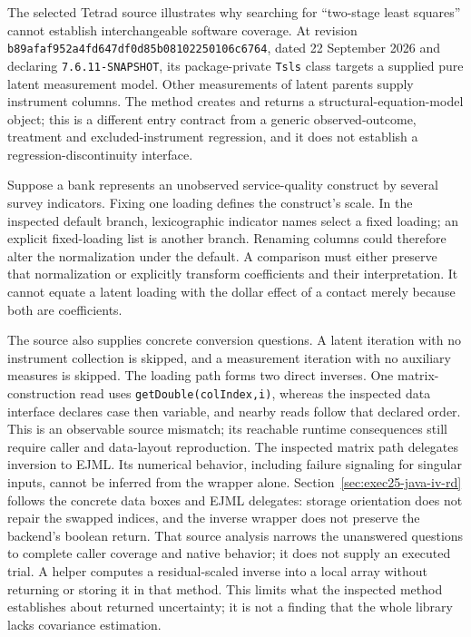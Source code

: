 The selected Tetrad source illustrates why searching for ``two-stage least
squares'' cannot establish interchangeable software coverage. At revision
\texttt{b89afaf952a4fd647df0}\allowbreak\texttt{d85b08102250106c6764}, dated 22 September 2026
and declaring \texttt{7.6.11-SNAPSHOT}, its package-private \texttt{Tsls}
class targets a supplied pure latent measurement model. Other measurements of
latent parents supply instrument columns. The method creates and returns a
structural-equation-model object; this is a different entry contract from a
generic observed-outcome, treatment and excluded-instrument regression, and
it does not establish a regression-discontinuity interface.
\citep{exec22_java_latent_iv_preflight}

Suppose a bank represents an unobserved service-quality construct by several
survey indicators. Fixing one loading defines the construct's scale. In the
inspected default branch, lexicographic indicator names select a fixed loading;
an explicit fixed-loading list is another branch. Renaming columns could
therefore alter the normalization under the default. A comparison must either
preserve that normalization or explicitly transform coefficients and their
interpretation. It cannot equate a latent loading with the dollar effect of a
contact merely because both are coefficients.

The source also supplies concrete conversion questions. A latent iteration
with no instrument collection is skipped, and a measurement iteration with
no auxiliary measures is skipped. The loading path forms two direct inverses.
One matrix-construction read uses \texttt{getDouble(colIndex,i)}, whereas the
inspected data interface declares case then variable, and nearby reads follow
that declared order. This is an observable source mismatch; its reachable
runtime consequences still require caller and data-layout reproduction.
The inspected matrix path delegates inversion to EJML. Its numerical behavior,
including failure signaling for singular inputs, cannot be inferred from the
wrapper alone. Section~\ref{sec:exec25-java-iv-rd} follows the concrete data
boxes and EJML delegates: storage orientation does not repair the swapped
indices, and the inverse wrapper does not preserve the backend's boolean
return. That source analysis narrows the unanswered questions to complete
caller coverage and native behavior; it does not supply an executed trial. A helper computes a residual-scaled inverse into a local array
without returning or storing it in that method. This limits what the inspected
method establishes about returned uncertainty; it is not a finding that the
whole library lacks covariance estimation.~\citep{exec22_java_latent_iv_preflight}

